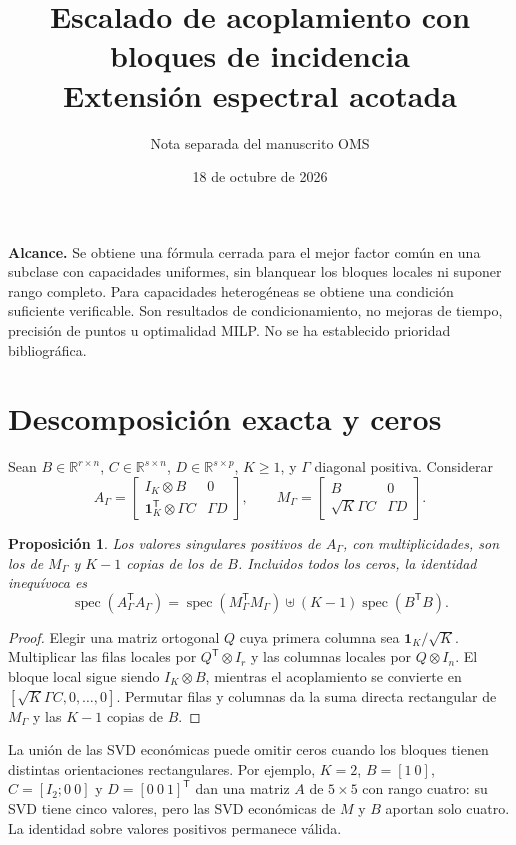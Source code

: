 \documentclass[10pt,a4paper]{article}
\title{Escalado de acoplamiento con bloques de incidencia\\Extensión espectral acotada}
\author{Nota separada del manuscrito OMS}\date{18 de octubre de 2026}
\newtheorem{proposition}{Proposición}
\begin{document}
\maketitle
\noindent\textbf{Alcance.} Se obtiene una fórmula cerrada para el mejor factor común
en una subclase con capacidades uniformes, sin blanquear los bloques locales ni
suponer rango completo. Para capacidades heterogéneas se obtiene una condición
suficiente verificable. Son resultados de condicionamiento, no mejoras de tiempo,
precisión de puntos u optimalidad MILP. No se ha establecido prioridad bibliográfica.

\section{Descomposición exacta y ceros}
Sean $B\in\mathbb R^{r\times n}$, $C\in\mathbb R^{s\times n}$,
$D\in\mathbb R^{s\times p}$, $K\ge1$, y $\Gamma$ diagonal positiva. Considerar
\[
 A_\Gamma=\begin{bmatrix}I_K\otimes B&0\\
 \mathbf1_K^{\mathsf T}\otimes\Gamma C&\Gamma D\end{bmatrix},
 \qquad
 M_\Gamma=\begin{bmatrix}B&0\\\sqrt K\Gamma C&\Gamma D\end{bmatrix}.
\]
\begin{proposition}
Los valores singulares positivos de $A_\Gamma$, con multiplicidades, son los de
$M_\Gamma$ y $K-1$ copias de los de $B$. Incluidos todos los ceros, la identidad
inequívoca es
\[
 \operatorname{spec}(A_\Gamma^{\mathsf T}A_\Gamma)=
 \operatorname{spec}(M_\Gamma^{\mathsf T}M_\Gamma)
 \uplus (K-1)\operatorname{spec}(B^{\mathsf T}B).
\]
\end{proposition}
\begin{proof}
Elegir una matriz ortogonal $Q$ cuya primera columna sea
$\mathbf1_K/\sqrt K$. Multiplicar las filas locales por
$Q^{\mathsf T}\otimes I_r$ y las columnas locales por $Q\otimes I_n$.
El bloque local sigue siendo $I_K\otimes B$, mientras el acoplamiento se convierte
en $[\sqrt K\Gamma C,0,\ldots,0]$. Permutar filas y columnas da la suma directa
rectangular de $M_\Gamma$ y las $K-1$ copias de $B$.
\end{proof}
La unión de las SVD económicas puede omitir ceros cuando los bloques tienen
distintas orientaciones rectangulares. Por ejemplo, $K=2$, $B=[1\ 0]$,
$C=[I_2;0\ 0]$ y $D=[0\ 0\ 1]^{\mathsf T}$ dan una matriz $A$ de $5\times5$
con rango cuatro: su SVD tiene cinco valores, pero las SVD económicas de $M$ y
$B$ aportan solo cuatro. La identidad sobre valores positivos permanece válida.
\end{document}
